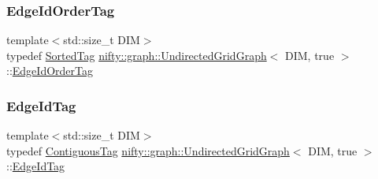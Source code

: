 \subsubsection{\texorpdfstring{Edge\+Id\+Order\+Tag}{EdgeIdOrderTag}}
{\footnotesize\ttfamily template$<$std\+::size\+\_\+t D\+IM$>$ \\
typedef \hyperlink{structnifty_1_1graph_1_1SortedTag}{Sorted\+Tag} \hyperlink{classnifty_1_1graph_1_1UndirectedGridGraph}{nifty\+::graph\+::\+Undirected\+Grid\+Graph}$<$ D\+IM, true $>$\+::\hyperlink{classnifty_1_1graph_1_1UndirectedGridGraph_3_01DIM_00_01true_01_4_aca991599ad4c8532f2d07ed7bc507449}{Edge\+Id\+Order\+Tag}}

\mbox{\label{classnifty_1_1graph_1_1UndirectedGridGraph_3_01DIM_00_01true_01_4_a0d9a24c893bf3f5f0cd61873bb77dfe1}} 
\subsubsection{\texorpdfstring{Edge\+Id\+Tag}{EdgeIdTag}}
{\footnotesize\ttfamily template$<$std\+::size\+\_\+t D\+IM$>$ \\
typedef \hyperlink{structnifty_1_1graph_1_1ContiguousTag}{Contiguous\+Tag} \hyperlink{classnifty_1_1graph_1_1UndirectedGridGraph}{nifty\+::graph\+::\+Undirected\+Grid\+Graph}$<$ D\+IM, true $>$\+::\hyperlink{classnifty_1_1graph_1_1UndirectedGridGraph_3_01DIM_00_01true_01_4_a0d9a24c893bf3f5f0cd61873bb77dfe1}{Edge\+Id\+Tag}}

\mbox{\label{classnifty_1_1graph_1_1UndirectedGridGraph_3_01DIM_00_01true_01_4_adc2fd416d91079b5450887b0c2c3cf05}} 
